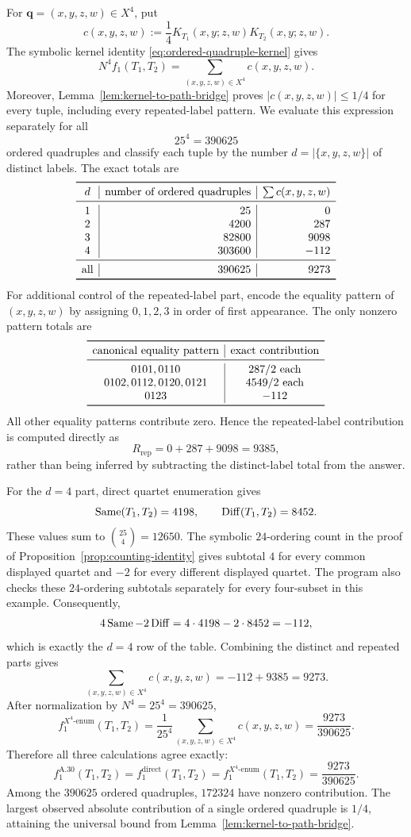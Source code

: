 For $\boldsymbol q=(x,y,z,w)\in X^4$, put
\[
 c(x,y,z,w)
 :=\frac14K_{T_1}(x,y;z,w)K_{T_2}(x,y;z,w).
\]
The symbolic kernel identity \eqref{eq:ordered-quadruple-kernel} gives
\[
 N^4f_1(T_1,T_2)=\sum_{(x,y,z,w)\in X^4}c(x,y,z,w).
\]
Moreover, Lemma~\ref{lem:kernel-to-path-bridge} proves
$|c(x,y,z,w)|\le1/4$ for every tuple, including every repeated-label
pattern.
We evaluate this expression separately for all
\[
 25^4=390625
\]
ordered quadruples and classify each tuple by the number
$d=|\{x,y,z,w\}|$ of distinct labels.  The exact totals are
\[
\begin{array}{c|r|r}
\toprule
d&\text{number of ordered quadruples}&\sum c(x,y,z,w)\\
\midrule
1&25&0\\
2&4200&287\\
3&82800&9098\\
4&303600&-112\\
\midrule
\text{all}&390625&9273\\
\bottomrule
\end{array}
\]
For additional control of the repeated-label part, encode the equality pattern
of $(x,y,z,w)$ by assigning $0,1,2,3$ in order of first appearance.  The only
nonzero pattern totals are
\[
\begin{array}{c|c}
\toprule
\text{canonical equality pattern}&\text{exact contribution}\\
\midrule
0101, 0110&287/2\text{ each}\\
0102, 0112, 0120, 0121&4549/2\text{ each}\\
0123&-112\\
\bottomrule
\end{array}
\]
All other equality patterns contribute zero.  Hence the repeated-label
contribution is computed directly as
\[
 R_{\mathrm{rep}}=0+287+9098=9385,
\]
rather than being inferred by subtracting the distinct-label total from the
answer.

For the $d=4$ part, direct quartet enumeration gives
\[
 \operatorname{Same}(T_1,T_2)=4198,
 \qquad
 \operatorname{Diff}(T_1,T_2)=8452.
\]
These values sum to $\binom{25}{4}=12650$.  The symbolic $24$-ordering count
in the proof of Proposition~\ref{prop:counting-identity} gives subtotal $4$
for every common displayed quartet and $-2$ for every different displayed
quartet.  The program also checks these $24$-ordering subtotals separately
for every four-subset in this example.  Consequently,
\[
 4\operatorname{Same}-2\operatorname{Diff}
 =4\cdot4198-2\cdot8452
 =-112,
\]
which is exactly the $d=4$ row of the table.  Combining the distinct and
repeated parts gives
\[
 \sum_{(x,y,z,w)\in X^4}c(x,y,z,w)
 =-112+9385
 =9273.
\]
After normalization by $N^4=25^4=390625$,
\[
 f_1^{X^4\text{-enum}}(T_1,T_2)
 =\frac1{25^4}\sum_{(x,y,z,w)\in X^4}c(x,y,z,w)
 =\frac{9273}{390625}.
\]
Therefore all three calculations agree exactly:
\[
\boxed{
 f_1^{\mathrm{A.30}}(T_1,T_2)
 =f_1^{\mathrm{direct}}(T_1,T_2)
 =f_1^{X^4\text{-enum}}(T_1,T_2)
 =\frac{9273}{390625}}.
\]
Among the $390625$ ordered quadruples, $172324$ have nonzero contribution.
The largest observed absolute contribution of a single ordered quadruple is
$1/4$, attaining the universal bound from
Lemma~\ref{lem:kernel-to-path-bridge}.

